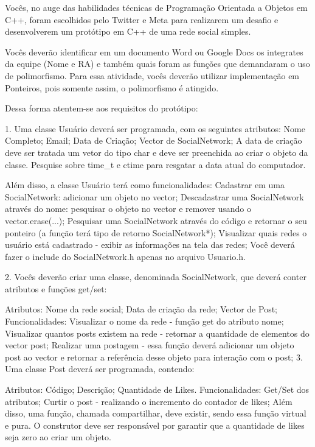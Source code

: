 Vocês, no auge das habilidades técnicas de Programação Orientada a Objetos em C++, foram escolhidos pelo Twitter e Meta para realizarem um desafio e desenvolverem um protótipo em C++ de uma rede social simples.

Vocês deverão identificar em um documento Word ou Google Docs os integrates da equipe (Nome e RA) e também quais foram as funções que demandaram o uso de polimorfismo. Para essa atividade, vocês deverão utilizar implementação em Ponteiros, pois somente assim, o polimorfismo é atingido.


Dessa forma atentem-se aos requisitos do protótipo:

1. Uma classe Usuário deverá ser programada, com os seguintes atributos:
Nome Completo;
Email;
Data de Criação;
Vector de SocialNetwork;
A data de criação deve ser tratada um vetor do tipo char e deve ser preenchida ao criar o objeto da classe. Pesquise sobre time_t e ctime para resgatar a data atual do computador.

Além disso, a classe Usuário terá como funcionalidades:
Cadastrar em uma SocialNetwork: adicionar um objeto no vector;
Descadastrar uma SocialNetwork através do nome: pesquisar o objeto no vector e remover usando o vector.erase(...);
Pesquisar uma SocialNetwork através do código e retornar o seu ponteiro (a função terá tipo de retorno SocialNetwork*);
Visualizar quais redes o usuário está cadastrado - exibir as informações na tela das redes;
Você deverá fazer o include do SocialNetwork.h apenas no arquivo Usuario.h.

2. Vocês deverão criar uma classe, denominada SocialNetwork, que deverá conter atributos  e funções get/set:

Atributos:
Nome da rede social;
Data de criação da rede;
Vector de Post;
Funcionalidades:
Visualizar o nome da rede - função get do atributo nome;
Visualizar quantos posts existem na rede - retornar a quantidade de elementos do vector post;
Realizar uma postagem - essa função deverá adicionar um objeto post ao vector e retornar a referência desse objeto para interação com o post;
3. Uma classe Post deverá ser programada, contendo:

Atributos:
Código;
Descrição;
Quantidade de Likes.
Funcionalidades:
Get/Set dos atributos;
Curtir o post - realizando o incremento do contador de likes;
Além disso, uma função, chamada compartilhar, deve existir, sendo essa função virtual e pura.
O construtor deve ser responsável por garantir que a quantidade de likes seja zero ao criar um objeto.

